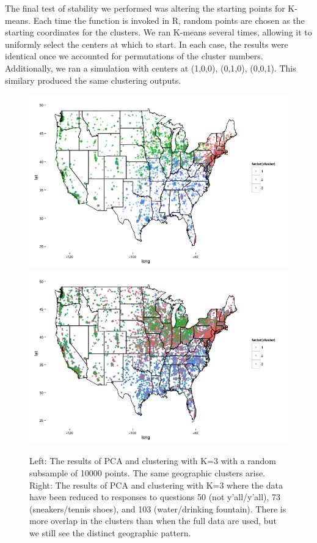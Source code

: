 \documentclass[english]{article}\usepackage{graphicx, color}
\numberwithin{equation}{section}
\numberwithin{figure}{section}
\begin{document}
The final test of stability we performed was altering the starting points for K-means. Each time the function is invoked in R, random points are chosen as the starting coordinates for the clusters. We ran K-means several times, allowing it to uniformly select the centers at which to start. In each case, the results were identical once we accounted for permutations of the cluster numbers. Additionally, we ran a simulation with centers at (1,0,0), (0,1,0), (0,0,1). This similary produced the same clustering outputs.

\begin{figure}
\includegraphics[scale=.4]{pcasubsample.png}
\includegraphics[scale=.4]{pca3questions.png}
\caption{Left: The results of PCA and clustering with K=3 with a random subsample of 10000 points. The same geographic clusters arise. Right: The results of PCA and clustering with K=3 where the data have been reduced to responses to questions 50 (not y'all/y'all), 73 (sneakers/tennis shoes), and 103 (water/drinking fountain). There is more overlap in the clusters than when the full data are used, but we still see the distinct geographic pattern.}
\end{figure}
\end{document}
